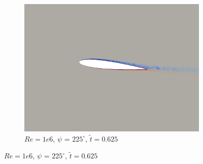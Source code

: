 \begin{figure}[H]
\begin{subfigure}[b]{0.32\textwidth}
		\includegraphics[width=1\textwidth]{figures/Vorticity_plots/Re_1m_1pt0/phase_225.png}
		\caption{$Re=1e6$, $\psi$ = $225^\circ$,  $\tilde{t}=0.625$}
		\label{fig:Re_1m_1pt0_phi225}
	\end{subfigure}
	

\end{figure}

